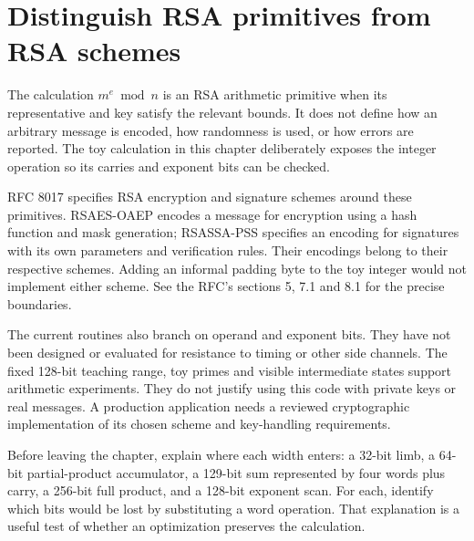 \section{Distinguish RSA primitives from RSA schemes}
The calculation \(m^e\bmod n\) is an RSA arithmetic primitive when its representative
and key satisfy the relevant bounds. It does not define how an arbitrary message is
encoded, how randomness is used, or how errors are reported. The toy calculation in
this chapter deliberately exposes the integer operation so its carries and exponent
bits can be checked.

RFC 8017 specifies RSA encryption and signature schemes around these primitives.
RSAES-OAEP encodes a message for encryption using a hash function and mask generation;
RSASSA-PSS specifies an encoding for signatures with its own parameters and verification
rules. Their encodings belong to their respective schemes. Adding an informal padding
byte to the toy integer would not implement either scheme. See the RFC's sections 5,
7.1 and 8.1 for the precise boundaries.

The current routines also branch on operand and exponent bits. They have not been
designed or evaluated for resistance to timing or other side channels. The fixed
128-bit teaching range, toy primes and visible intermediate states support arithmetic
experiments. They do not justify using this code with private keys or real messages.
A production application needs a reviewed cryptographic implementation of its chosen
scheme and key-handling requirements.

Before leaving the chapter, explain where each width enters: a 32-bit limb, a 64-bit
partial-product accumulator, a 129-bit sum represented by four words plus carry, a
256-bit full product, and a 128-bit exponent scan. For each, identify which bits would
be lost by substituting a word operation. That explanation is a useful test of whether
an optimization preserves the calculation.

